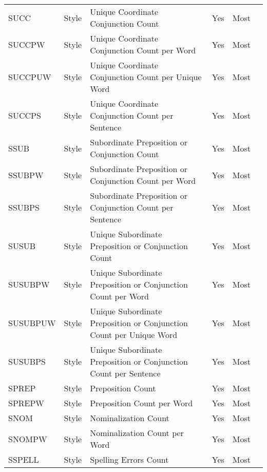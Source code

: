 \begin{longtable}{l l m{} c c m{}}
    SUCC & Style & Unique Coordinate Conjunction Count & Yes & Most & \cite{Bassani2019_lr359} \\
    SUCCPW & Style & Unique Coordinate Conjunction Count per Word & Yes & Most & \cite{Bassani2019_lr359} \\
    SUCCPUW & Style & Unique Coordinate Conjunction Count per Unique Word & Yes & Most & \cite{Bassani2019_lr359} \\
    SUCCPS & Style & Unique Coordinate Conjunction Count per Sentence & Yes & Most & \cite{Bassani2019_lr359} \\
    SSUB & Style & Subordinate Preposition or Conjunction Count & Yes & Most & \cite{Bassani2019_lr359} \\
    SSUBPW & Style & Subordinate Preposition or Conjunction Count per Word & Yes & Most & \cite{Bassani2019_lr359} \\
    SSUBPS & Style & Subordinate Preposition or Conjunction Count per Sentence & Yes & Most & \cite{Bassani2019_lr359} \\
    SUSUB & Style & Unique Subordinate Preposition or Conjunction Count & Yes & Most & \cite{Bassani2019_lr359} \\
    SUSUBPW & Style & Unique Subordinate Preposition or Conjunction Count per Word & Yes & Most & \cite{Bassani2019_lr359} \\
    SUSUBPUW & Style & Unique Subordinate Preposition or Conjunction Count per Unique Word & Yes & Most & \cite{Bassani2019_lr359} \\
    SUSUBPS & Style & Unique Subordinate Preposition or Conjunction Count per Sentence & Yes & Most & \cite{Bassani2019_lr359} \\
    SPREP & Style & Preposition Count & Yes & Most & \cite{Dalip2016_lr1002, Dalip2014_lr1004, Magalhaes2019_lr2028} \\
    SPREPW & Style & Preposition Count per Word & Yes & Most & \cite{Dalip2009_lr14, Anderka2012_lr17, Wang2020_lr26, Wang2019_lr74, Ferretti2012_lr115, Pereyra2019_lr147, Dalip2011_lr1003} \\
    SNOM & Style & Nominalization Count & Yes & Most & \cite{Dalip2014_lr1004, Magalhaes2019_lr2028} \\
    SNOMPW & Style & Nominalization Count per Word & Yes & Most & \cite{Dalip2009_lr14, Anderka2012_lr17, Wang2020_lr26, Wang2019_lr74, Dalip2011_lr1003} \\
    SSPELL & Style & Spelling Errors Count & Yes & Most & \cite{Wu2010_lr61, Dalip2016_lr1002, Yang2016_lr2001} \\

\end{longtable}
